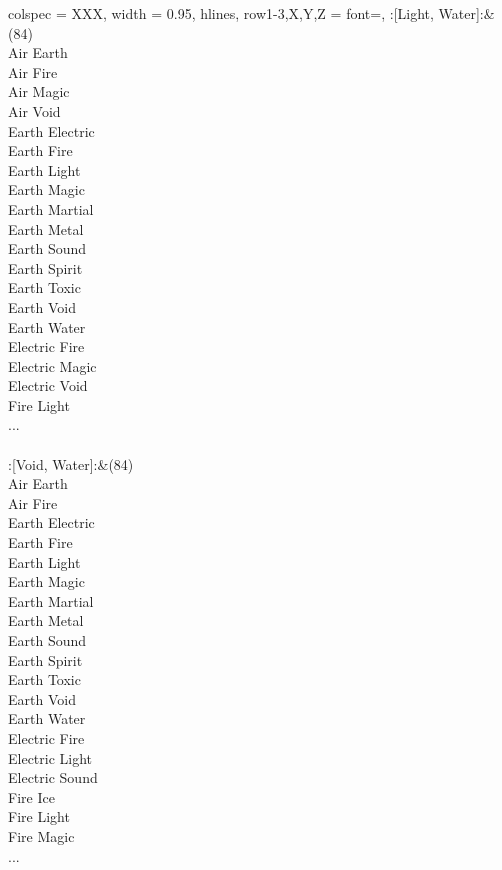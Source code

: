 \begin{longtblr}[
	caption = {2v2 Defending Weak},
	label = {2v2-Defending-Weak},
]{
	colspec = {XXX}, width = 0.95\linewidth,
	hlines,
	row{1-3,X,Y,Z} = {font=\bfseries},
}
	:[Light, Water]:&{(84)\\
	Air Earth \\
	Air Fire \\
	Air Magic \\
	Air Void \\
	Earth Electric \\
	Earth Fire \\
	Earth Light \\
	Earth Magic \\
	Earth Martial \\
	Earth Metal \\
	Earth Sound \\
	Earth Spirit \\
	Earth Toxic \\
	Earth Void \\
	Earth Water \\
	Electric Fire \\
	Electric Magic \\
	Electric Void \\
	Fire Light \\
	...\\
	}\\

	:[Void, Water]:&{(84)\\
	Air Earth \\
	Air Fire \\
	Earth Electric \\
	Earth Fire \\
	Earth Light \\
	Earth Magic \\
	Earth Martial \\
	Earth Metal \\
	Earth Sound \\
	Earth Spirit \\
	Earth Toxic \\
	Earth Void \\
	Earth Water \\
	Electric Fire \\
	Electric Light \\
	Electric Sound \\
	Fire Ice \\
	Fire Light \\
	Fire Magic \\
	...\\
	}\\


\end{longtblr}
